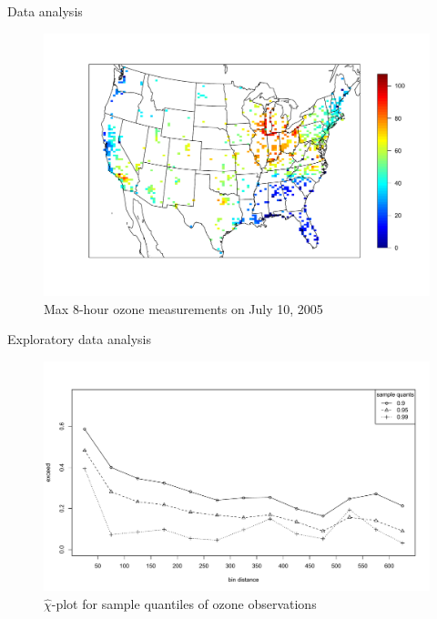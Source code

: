 \documentclass{beamer}
\begin{document}
\begin{frame}{Data analysis}
  \centering
  \begin{figure}
    \includegraphics[width=\linewidth, trim=0 1in 0 0in ]{./plots/pot/ozone-10jul-us.pdf}
    \caption{Max 8-hour ozone measurements on July 10, 2005}
   \end{figure}

\end{frame}

\begin{frame}{Exploratory data analysis}
	\centering
  \begin{figure}
    \includegraphics[width=1\linewidth]{./plots/pot/chi-plot-ozone-res.pdf}
    \caption{$\widehat{\chi}$-plot for sample quantiles of ozone observations}
  \end{figure}
\end{frame}
\end{document}
